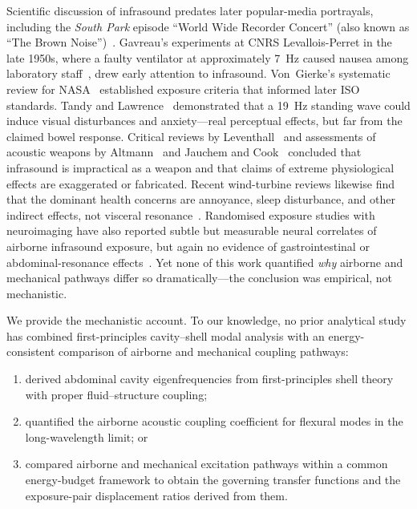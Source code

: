 Scientific discussion of infrasound predates later popular-media portrayals,
including the \emph{South Park} episode ``World Wide Recorder Concert'' (also
known as ``The Brown Noise'')~\cite{SouthPark2000BrownNoise}.  Gavreau's
experiments at CNRS Levallois-Perret
in the late 1950s, where a faulty ventilator at approximately
\SI{7}{\hertz} caused nausea among laboratory
staff~\cite{Gavreau1966,Leventhall2007},
drew early attention to infrasound.  Von~Gierke's systematic review for
NASA~\cite{vonGierke1974,vonGierke2002} established exposure criteria that
informed later ISO standards.  Tandy and Lawrence~\cite{Tandy1998}
demonstrated that a \SI{19}{\hertz} standing wave could induce visual
disturbances and anxiety---real perceptual effects, but far from the claimed
bowel response.  Critical reviews by
Leventhall~\cite{Leventhall2003,Leventhall2007} and assessments of acoustic
weapons by Altmann~\cite{Altmann1999} and Jauchem and
Cook~\cite{Jauchem2007} concluded that infrasound is impractical as a weapon
and that claims of extreme physiological effects are exaggerated or
fabricated.  Recent wind-turbine reviews likewise find that the dominant
health concerns are annoyance, sleep disturbance, and other indirect effects,
not visceral resonance~\cite{vanKamp2021}.  Randomised exposure studies with
neuroimaging have also reported subtle but measurable neural correlates of
airborne infrasound exposure, but again no evidence of gastrointestinal or
abdominal-resonance effects~\cite{Ascone2021}.  Yet none of this work quantified \emph{why} airborne and
mechanical pathways differ so dramatically---the conclusion was empirical,
not mechanistic.

We provide the mechanistic account.  To our knowledge, no prior analytical study
has combined first-principles cavity--shell modal analysis with an
energy-consistent comparison of airborne and mechanical coupling pathways:
\begin{enumerate}
  \item derived abdominal cavity eigenfrequencies from first-principles
    shell theory with proper fluid--structure coupling;
  \item quantified the airborne acoustic coupling coefficient for flexural
    modes in the long-wavelength limit; or
  \item compared airborne and mechanical excitation pathways within a common
    energy-budget framework to obtain the governing transfer functions and the
    exposure-pair displacement ratios derived from them.
\end{enumerate}

